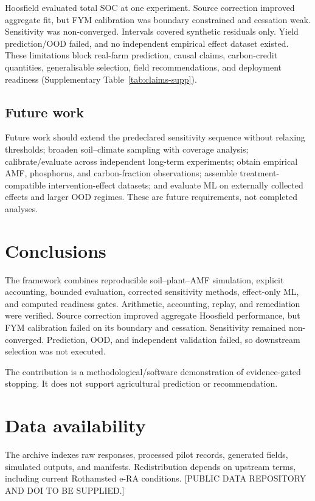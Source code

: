 \documentclass[11pt]{article}
\begin{document}
Hoosfield evaluated total SOC at one experiment. Source correction improved aggregate fit, but FYM calibration was boundary constrained and cessation weak. Sensitivity was non-converged. Intervals covered synthetic residuals only. Yield prediction/OOD failed, and no independent empirical effect dataset existed. These limitations block real-farm prediction, causal claims, carbon-credit quantities, generalisable selection, field recommendations, and deployment readiness (Supplementary Table~\ref{tab:claims-supp}).

\subsection{Future work}

Future work should extend the predeclared sensitivity sequence without relaxing thresholds; broaden soil--climate sampling with coverage analysis; calibrate/evaluate across independent long-term experiments; obtain empirical AMF, phosphorus, and carbon-fraction observations; assemble treatment-compatible intervention-effect datasets; and evaluate ML on externally collected effects and larger OOD regimes. These are future requirements, not completed analyses.

\section{Conclusions}

The framework combines reproducible soil--plant--AMF simulation, explicit accounting, bounded evaluation, corrected sensitivity methods, effect-only ML, and computed readiness gates. Arithmetic, accounting, replay, and remediation were verified. Source correction improved aggregate Hoosfield performance, but FYM calibration failed on its boundary and cessation. Sensitivity remained non-converged. Prediction, OOD, and independent validation failed, so downstream selection was not executed.

The contribution is a methodological/software demonstration of evidence-gated stopping. It does not support agricultural prediction or recommendation.

\section{Data availability}

The archive indexes raw responses, processed pilot records, generated fields, simulated outputs, and manifests. Redistribution depends on upstream terms, including current Rothamsted e-RA conditions. [PUBLIC DATA REPOSITORY AND DOI TO BE SUPPLIED.]
\end{document}

